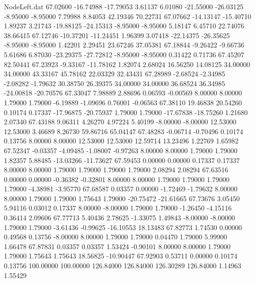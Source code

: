 \begin{filecontents}{NodeLeft.dat}
  67.02600  -16.74988  -17.79053     3.61137    6.01080  -21.55000  -26.03125   -8.95000   -8.95000    7.79988    8.84053   42.19346   70.22731
  67.07662  -14.13147  -15.40710     1.89237    3.21743  -19.88125  -24.15313   -8.95000   -8.95000    5.18147    6.45710   22.74076   38.66415
  67.12746  -10.37201  -11.24451     1.96399    3.07418  -22.14375  -26.35625   -8.95000   -8.95000    1.42201    2.29451   23.67246   37.05381
  67.18844   -9.26422   -9.66736     5.61686    6.87030  -23.29375  -27.72812   -8.95000   -8.95000    0.31422    0.71736   67.45207   82.50441
  67.23923   -9.33167  -11.78162     1.82074    2.68024   16.56250   14.08125   34.00000   34.00000   43.33167   45.78162   22.03329   32.43431
  67.28989   -2.68524   -2.34985    -2.08282   -1.79632   30.38750   26.39375   34.00000   34.00000   36.68524   36.34985  -24.00818  -20.70576
  67.33047    7.98889    2.88696     0.06593   -0.00569    8.00000    8.00000    1.79000    1.79000   -6.19889   -1.09696    0.76001   -0.06563
  67.38110   19.46838   20.54260     0.10174    0.17337  -17.96875  -20.75937    1.79000    1.79000  -17.67838  -18.75260    1.21680    2.07340
  67.43188    9.06311    4.26270     4.97224    5.40199   -8.00000   -8.00000   12.53000   12.53000    3.46689    8.26730   59.86716   65.04147
  67.48283   -0.06714   -0.70496     0.10174    0.13756    8.00000    8.00000   12.53000   12.53000   12.59714   13.23496    1.22769    1.65982
  67.52347   -0.03357   -4.09485    -1.08007   -0.97263    8.00000    8.00000    1.79000    1.79000    1.82357    5.88485  -13.03266  -11.73627
  67.59453    0.00000    0.00000     0.17337    0.17337    8.00000    8.00000    1.79000    1.79000    1.79000    1.79000    2.08294    2.08294
  67.63516    0.00000    0.00000    -0.36382   -0.32801    8.00000    8.00000    1.79000    1.79000    1.79000    1.79000   -4.38981   -3.95770
  67.68587    0.03357    0.00000    -1.72469   -1.79632    8.00000    8.00000    1.79000    1.79000    1.75643    1.79000  -20.75472  -21.61665
  67.73676    3.05450    5.94116     0.03012    0.17337    8.00000   -8.00000    1.79000    1.79000   -1.26450   -4.15116    0.36414    2.09606
  67.77713    5.40436    2.78625    -1.33075    1.49843   -8.00000   -8.00000    1.79000    1.79000   -3.61436   -0.99625  -16.10553   18.13483
  67.82773    1.74530    0.00000     0.49568    0.13756   -8.00000    8.00000    1.79000    1.79000    0.04470    1.79000    5.99900    1.66478
  67.87831    0.03357    0.03357     1.53424   -0.90101    8.00000    8.00000    1.79000    1.79000    1.75643    1.75643   18.56825  -10.90447
  67.92903    0.53711    0.00000     0.10174    0.13756  100.00000  100.00000  126.84000  126.84000  126.30289  126.84000    1.14963    1.55429

\end{filecontents}
